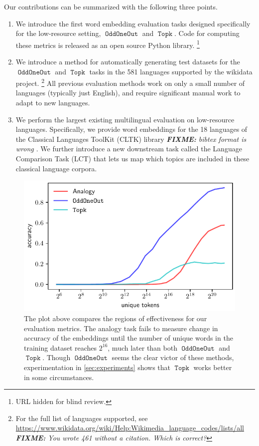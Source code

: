 \documentclass[11pt,a4paper]{article}
\DeclareMathOperator{\OddOneOut}{\texttt{OddOneOut}}
\DeclareMathOperator{\topk}{\texttt{Topk}}
\newcommand{\fixme}[1]{{\color{red}\itshape \textbf{FIXME:} {#1}}}
\begin{document}
Our contributions can be summarized with the following three points.

\label{sec:contributions}
\begin{enumerate}
    \item 
    We introduce the first word embedding evaluation tasks designed specifically for the low-resource setting, $\OddOneOut$ and $\topk$.
    Code for computing these metrics is released as an open source Python library.%
    \footnote{
        URL hidden for blind review.
    }
    \item 
    We introduce a method for automatically generating test datasets for the $\OddOneOut$ and $\topk$ tasks in the 581 languages supported by the wikidata project.%
        \footnote{For the full list of languages supported, see \url{https://www.wikidata.org/wiki/Help:Wikimedia_language_codes/lists/all} \fixme{You wrote 461 without a citation.  Which is correct?}}
    All previous evaluation methods work on only a small number of languages (typically just English),
    and require significant manual work to adapt to new languages.
	\item 
    We perform the largest existing multilingual evaluation on low-resource languages.
    Specifically, we provide word embeddings for the 18 languages of the Classical Languages ToolKit (CLTK) library \fixme{bibtex format is wrong \citep{johnson2014}}.
    We further introduce a new downstream task called the Language Comparison Task (LCT) that lets us map which topics are included in these classical language corpora.
\end{enumerate}

\begin{figure}
\centering
\includegraphics[width=1\columnwidth]{size_vs_acc.pdf} 
\caption{The plot above compares the regions of effectiveness for our evaluation metrics. 
The analogy task fails to measure change in accuracy of the embeddings until the number of unique words in the training dataset reaches  $2^{16}$, much later than both $\OddOneOut$ and $\topk$. 
Though $\OddOneOut$ seems the clear victor of these methods, experimentation in \ref{sec:experiments} shows that $\topk$ works better in some circumstances.}
\label{fig:size_vs_acc}
\end{figure}
\end{document}
